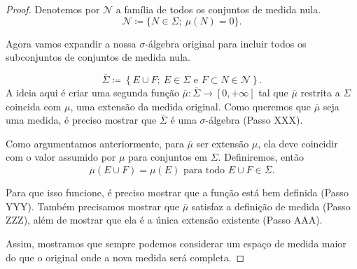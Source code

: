 \begin{proof}
    Denotemos por $\mathcal{N}$ a família de todos os conjuntos de medida nula.
    \begin{equation*}
        \mathcal{N}\coloneqq \{N\in\Sigma; \ \mu(N)=0\}.
    \end{equation*}
    
    Agora vamos expandir a nossa \texorpdfstring{$\sigma$}{sigma}-álgebra original para incluir todos os subconjuntos de conjuntos de medida nula.
    
    \begin{equation*}
        \overline{\Sigma}\coloneqq \left\{E\cup F; \ E\in \Sigma \text{ e } F\subset N\in\mathcal{N}\right\}.
    \end{equation*} 
    A ideia aqui é criar uma segunda função $\overline{\mu}:\overline{\Sigma}\rightarrow \left[0,+\infty\right]$ tal que $\overline{\mu}$ restrita a $\Sigma$ coincida com $\mu$, uma extensão da medida original. Como queremos que $\overline{\mu}$ seja uma medida, é preciso mostrar que $\overline{\Sigma}$ é uma \texorpdfstring{$\sigma$}{sigma}-álgebra (Passo XXX).

    Como argumentamos anteriormente, para $\overline{\mu}$ ser extensão $\mu$, ela deve coincidir com o valor assumido por $\mu$ para conjuntos em $\Sigma$. Definiremos, então
    \begin{equation*}
    \overline{\mu}(E\cup F) = \mu(E) \text{ para todo } E\cup F \in \overline{\Sigma}.
    \end{equation*}

    Para que isso funcione, é preciso mostrar que a função está bem definida (Passo YYY). Também precisamos mostrar que $\overline{\mu}$ satisfaz a definição de medida (Passo ZZZ), além de mostrar que ela é a única extensão existente (Passo AAA).

    Assim, mostramos que sempre podemos considerar um espaço de medida maior do que o original onde a nova medida será completa.
\end{proof}
